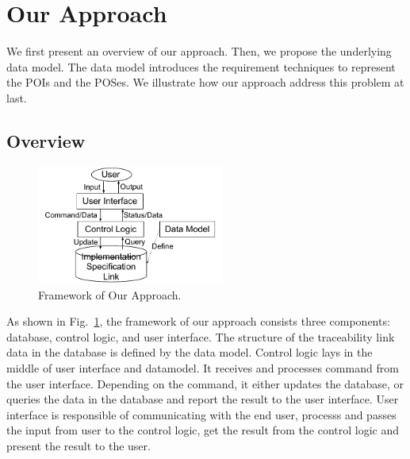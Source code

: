 \section{Our Approach}
\label{sec:approach}

We first present an overview of our approach. Then, we propose the underlying data model. The data model introduces the requirement  techniques to represent the POIs and the POSes. We illustrate how our approach address this problem at last.

\subsection{Overview}
\begin{figure}
\begin{center}
\includegraphics[width=0.55\textwidth]{framework}
\caption{Framework of Our Approach.}
\label{fig:framework}
\end{center}
\end{figure}

As shown in Fig.~\ref{fig:framework}, the framework of our approach consists three components: database, control logic, and user interface. The structure of the traceability link data in the database is defined by the data model. Control logic lays in the middle of user interface and datamodel. It receives and processes command from the user interface. Depending on the command, it either updates the database, or queries the data in the database and report the result to the user interface. User interface is responsible of communicating with the end user, processs and passes the input from user to the control logic, get the result from the control logic and present the result to the user.




